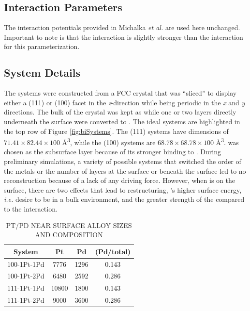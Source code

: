 \subsection{Interaction Parameters}
The interaction potentials provided in Michalka {\em et
al.}\citep{Michalka:2015aa} are used here unchanged. Important to note is that
the  interaction is slightly stronger than the
 interaction for this parameterization.

\subsection{System Details}
The systems were constructed from a FCC  crystal that was ``sliced'' to
display either a (111) or (100) facet in the {\em z}-direction while being
periodic in the {\em x} and {\em y} directions. The bulk of the crystal was
kept as  while one or two layers directly underneath the surface were
converted to . The ideal systems are highlighted in the top row of
Figure \ref{fig:biSystems}. The (111) systems have dimensions of
$71.41\times82.44\times100$ \AA\textsuperscript{3}, while the (100) systems are
$68.78\times68.78\times100$ \AA\textsuperscript{3}.  was chosen as the
subsurface layer because of its stronger binding to . During preliminary
simulations, a variety of possible systems that switched the order of the
metals or the number of layers at the surface or beneath the surface led to no
reconstruction because of a lack of any driving force.  However, when 
is on the surface, there are two effects that lead to restructuring, 's
higher surface energy, {\em i.e.} desire to be in a bulk environment, and the
greater strength of the  compared to the 
interaction.

\begin{table}
  \caption{PT/PD NEAR SURFACE ALLOY SIZES AND COMPOSITION}
  \centering
  \begin{threeparttable}
  \begin{tabular}{ c ccc }
  \hline
  \hline
  \textbf{System} & \textbf{Pt} & \textbf{Pd} &  \textbf{(Pd/total)} \\
  \hline
  100-1Pt-1Pd & 7776 & 1296  & 0.143 \\
  100-1Pt-2Pd & 6480  & 2592  & 0.286 \\
  111-1Pt-1Pd & 10800  & 1800  & 0.143 \\
  111-1Pt-2Pd & 9000 & 3600  & 0.286 \\
  \hline
  \hline
  \end{tabular}
  \end{threeparttable}
\label{tab:systems}
\end{table}


